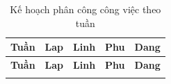 {\scriptsize
\setlength{\tabcolsep}{3pt}
\renewcommand{\arraystretch}{1.5}
\begin{longtable}{|>{\raggedright\arraybackslash}p{}|>{\raggedright\arraybackslash}p{}|>{\raggedright\arraybackslash}p{}|>{\raggedright\arraybackslash}p{}|>{\raggedright\arraybackslash}p{}|}
\caption{Kế hoạch phân công công việc theo tuần}\\
\hline
\textbf{Tuần} & \textbf{Lap} & \textbf{Linh} & \textbf{Phu} & \textbf{Dang} \\
\hline
\endfirsthead

\hline
\textbf{Tuần} & \textbf{Lap} & \textbf{Linh} & \textbf{Phu} & \textbf{Dang} \\
\hline
\endhead

\hline
\endfoot


\end{longtable}}
